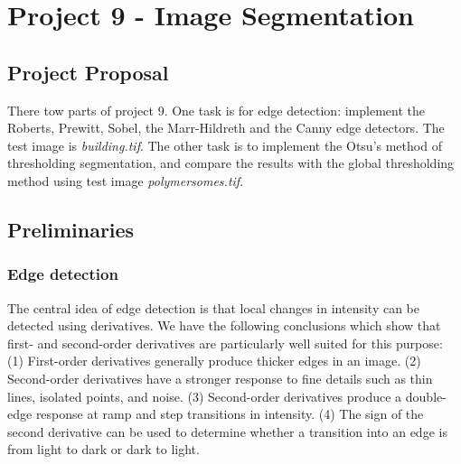 \section{Project 9 - Image Segmentation}

\subsection{Project Proposal}
There tow parts of project 9. One task is for edge detection: implement the Roberts, Prewitt, Sobel, the Marr-Hildreth and the Canny edge detectors. The test image is \emph{building.tif}. The other task is to implement the Otsu’s method of thresholding segmentation, and compare the results with the global thresholding method using test image \emph{polymersomes.tif}.

\subsection{Preliminaries}
\subsubsection{Edge detection}
The central idea of edge detection is that local changes in intensity can be detected using derivatives. We have the following conclusions which show that first- and second-order derivatives are particularly well suited for this purpose: (1) First-order derivatives generally produce thicker edges in an image. (2) Second-order derivatives have a stronger response to fine details such as thin lines, isolated points, and noise. (3) Second-order derivatives produce a double-edge response at ramp and step transitions in intensity. (4) The sign of the second derivative can be used to determine whether a transition into an edge is from light to dark or dark to light.

